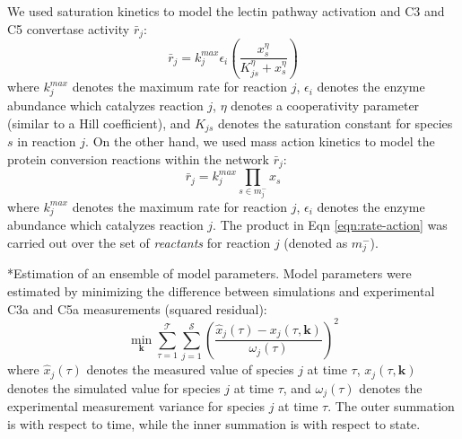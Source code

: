 \documentclass[12pt]{article}
\makeatletter
\renewcommand\subsection{\@startsection
	{subsection}{2}{0mm}
	{-0.05in}
	{-0.5\baselineskip}
	{\normalfont\normalsize\bfseries}}
\makeatother
\begin{document}
We used saturation kinetics to model the lectin pathway activation and C3 and C5 convertase activity $\bar{r}_{j}$:
\begin{equation}\label{eqn:rate-saturation}
	\bar{r}_{j} = k_{j}^{max}\epsilon_{i}\left(\frac{x_{s}^{\eta}}{K_{js}^{\eta} + x_{s}^{\eta}}\right)
\end{equation}
where $k_{j}^{max}$ denotes the maximum rate for reaction $j$, $\epsilon_{i}$ denotes the enzyme abundance which catalyzes reaction $j$, $\eta$ denotes a cooperativity parameter (similar to a Hill coefficient), and $K_{js}$ denotes the saturation constant for species $s$ in reaction $j$. On the other hand,
we used mass action kinetics to model the protein conversion reactions within the network $\bar{r}_{j}$:
\begin{equation}\label{eqn:rate-action}
	\bar{r}_{j} = k_{j}^{max}\prod_{s\in{m_{j}^{-}}}x_{s}
\end{equation}
where $k_{j}^{max}$ denotes the maximum rate for reaction $j$, $\epsilon_{i}$ denotes the enzyme abundance which catalyzes reaction $j$. The product in Eqn \eqref{eqn:rate-action} was carried out over the set of \textit{reactants} for reaction $j$ (denoted as $m_{j}^{-}$).


\subsection*{Estimation of an ensemble of model parameters.}
Model parameters were estimated by minimizing the difference between simulations and experimental C3a and C5a measurements (squared residual):
\begin{equation}\label{eqn:objective-function}
	\min_{\mathbf{k}} \sum_{\tau=1}^{\mathcal{T}}\sum_{j=1}^{\mathcal{S}}\left(\frac{\hat{x}_{j}\left(\tau\right) - x_{j}\left(\tau,\mathbf{k}\right)}{\omega_{j}\left(\tau\right)}\right)^{2}
\end{equation}where $\hat{x}_{j}\left(\tau\right)$ denotes the measured value of species $j$ at time $\tau$, $x_{j}\left(\tau,\mathbf{k}\right)$ denotes the simulated
value for species $j$ at time $\tau$, and $\omega_{j}\left(\tau\right)$ denotes the experimental measurement variance for species $j$ at time $\tau$. The outer summation is with respect to
time, while the inner summation is with respect to state. 
\end{document}
